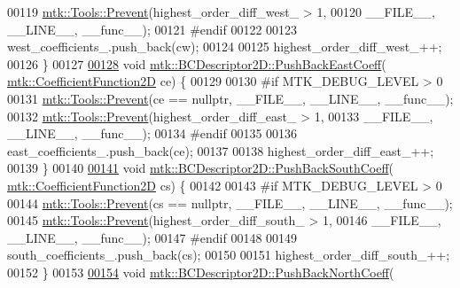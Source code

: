 \begin{DoxyCode}
00119   \hyperlink{classmtk_1_1Tools_a332324c6f25e66be9dff48c5987a3b9f}{mtk::Tools::Prevent}(highest\_order\_diff\_west\_ > 1,
00120                       \_\_FILE\_\_, \_\_LINE\_\_, \_\_func\_\_);
00121 \textcolor{preprocessor}{  #endif}
00122 
00123   west\_coefficients\_.push\_back(cw);
00124 
00125   highest\_order\_diff\_west\_++;
00126 \}
00127 
\hypertarget{mtk__bc__descriptor__2d_8cc_source_l00128}{}\hyperlink{classmtk_1_1BCDescriptor2D_a27635428a6c36d1e305cafdc68271063}{00128} \textcolor{keywordtype}{void} \hyperlink{classmtk_1_1BCDescriptor2D_a27635428a6c36d1e305cafdc68271063}{mtk::BCDescriptor2D::PushBackEastCoeff}(
      \hyperlink{group__c07-mim__ops_gad9e1c0ace886b0029aefffa5f320e852}{mtk::CoefficientFunction2D} ce) \{
00129 
00130 \textcolor{preprocessor}{  #if MTK\_DEBUG\_LEVEL > 0}
00131   \hyperlink{classmtk_1_1Tools_a332324c6f25e66be9dff48c5987a3b9f}{mtk::Tools::Prevent}(ce == \textcolor{keyword}{nullptr}, \_\_FILE\_\_, \_\_LINE\_\_, \_\_func\_\_);
00132   \hyperlink{classmtk_1_1Tools_a332324c6f25e66be9dff48c5987a3b9f}{mtk::Tools::Prevent}(highest\_order\_diff\_east\_ > 1,
00133                       \_\_FILE\_\_, \_\_LINE\_\_, \_\_func\_\_);
00134 \textcolor{preprocessor}{  #endif}
00135 
00136   east\_coefficients\_.push\_back(ce);
00137 
00138   highest\_order\_diff\_east\_++;
00139 \}
00140 
\hypertarget{mtk__bc__descriptor__2d_8cc_source_l00141}{}\hyperlink{classmtk_1_1BCDescriptor2D_a9eb891f14c68968a0113632fa5fea630}{00141} \textcolor{keywordtype}{void} \hyperlink{classmtk_1_1BCDescriptor2D_a9eb891f14c68968a0113632fa5fea630}{mtk::BCDescriptor2D::PushBackSouthCoeff}(
      \hyperlink{group__c07-mim__ops_gad9e1c0ace886b0029aefffa5f320e852}{mtk::CoefficientFunction2D} cs) \{
00142 
00143 \textcolor{preprocessor}{  #if MTK\_DEBUG\_LEVEL > 0}
00144   \hyperlink{classmtk_1_1Tools_a332324c6f25e66be9dff48c5987a3b9f}{mtk::Tools::Prevent}(cs == \textcolor{keyword}{nullptr}, \_\_FILE\_\_, \_\_LINE\_\_, \_\_func\_\_);
00145   \hyperlink{classmtk_1_1Tools_a332324c6f25e66be9dff48c5987a3b9f}{mtk::Tools::Prevent}(highest\_order\_diff\_south\_ > 1,
00146                       \_\_FILE\_\_, \_\_LINE\_\_, \_\_func\_\_);
00147 \textcolor{preprocessor}{  #endif}
00148 
00149   south\_coefficients\_.push\_back(cs);
00150 
00151   highest\_order\_diff\_south\_++;
00152 \}
00153 
\hypertarget{mtk__bc__descriptor__2d_8cc_source_l00154}{}\hyperlink{classmtk_1_1BCDescriptor2D_a0fed58bd058d699a572888fe4b9934a4}{00154} \textcolor{keywordtype}{void} \hyperlink{classmtk_1_1BCDescriptor2D_a0fed58bd058d699a572888fe4b9934a4}{mtk::BCDescriptor2D::PushBackNorthCoeff}(

\end{DoxyCode}
